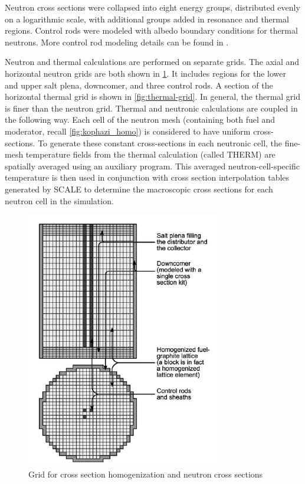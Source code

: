 \documentclass{article}
\begin{document}
Neutron cross sections were collapsed into eight energy groups, distributed
evenly on a logarithmic scale, with additional groups added in resonance and
thermal regions. Control rods were modeled with albedo boundary conditions for
thermal neutrons. More control rod modeling details can be found in
\cite{kophazi_development_????}.

Neutron and thermal calculations are performed on separate grids. The axial and
horizontal neutron grids are both shown in \cref{fig:neutron-grid}. It includes
regions for the lower and upper salt plena, downcomer, and three control rods. A
section of the horizontal thermal grid is shown in \cref{fig:thermal-grid}. In
general, the thermal grid is finer than the neutron grid. Thermal and neutronic
calculations are coupled in the following way. Each cell of the neutron mesh
(containing both fuel and moderator, recall \cref{fig:kophazi_homo}) is
considered to have uniform cross-sections. To generate these constant
cross-sections in each neutronic cell, the fine-mesh temperature fields from
the thermal calculation (called THERM) are spatially averaged using an auxiliary
program. This averaged neutron-cell-specific temperature is then used in
conjunction with cross section interpolation tables generated by SCALE to
determine the macroscopic cross sections for each neutron cell in the
simulation.

\begin{figure}[htpb]
  \centering
  \includegraphics[max height=.5\textheight,max width=\textwidth,keepaspectratio]{3d-neutron-grid.png}
  \caption{Grid for cross section homogenization and neutron cross sections
    \cite{kophazi_development_????}}
  \label{fig:neutron-grid}
\end{figure}
\end{document}

